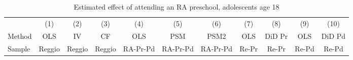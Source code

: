 \documentclass[12pt]{article}
\begin{document}
\begin{table}[ht]
\caption{Estimated effect of attending an RA preschool, adolescents age 18}
\label{tab:adoPS}
\begin{center}
\begin{adjustbox}{width=1.2\textwidth,center=\textwidth}
\small
\begin{tabular}{l*{10}{c}}
\hline\hline
& (1) & (2) & (3) & (4) & (5) & (6) & (7) & (8) & (9) & (10) \\ 
Method & OLS & IV & CF & OLS & PSM & PSM2 & OLS & DiD Pr & OLS & DiD Pd \\
Sample & Reggio & Reggio & Reggio & RA-Pr-Pd & RA-Pr-Pd & RA-Pr-Pd & Re-Pr & Re-Pr & Re-Pd & Re-Pd \\
\hline


\end{tabular}
\end{adjustbox}
\end{center}
\end{table}
\end{document}
